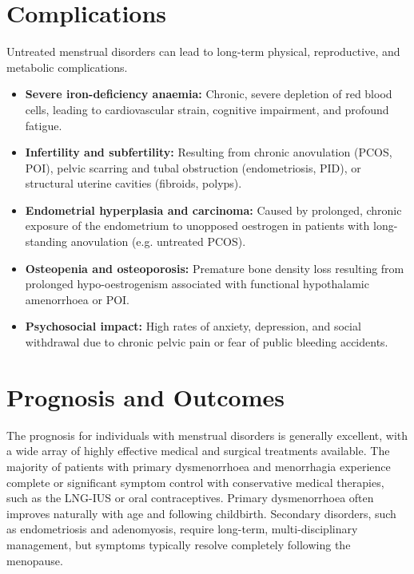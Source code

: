 \section*{Complications}
Untreated menstrual disorders can lead to long-term physical, reproductive, and metabolic complications.
\begin{itemize}
    \item \textbf{Severe iron-deficiency anaemia:} Chronic, severe depletion of red blood cells, leading to cardiovascular strain, cognitive impairment, and profound fatigue.
    \item \textbf{Infertility and subfertility:} Resulting from chronic anovulation (PCOS, POI), pelvic scarring and tubal obstruction (endometriosis, PID), or structural uterine cavities (fibroids, polyps).
    \item \textbf{Endometrial hyperplasia and carcinoma:} Caused by prolonged, chronic exposure of the endometrium to unopposed oestrogen in patients with long-standing anovulation (e.g. untreated PCOS).
    \item \textbf{Osteopenia and osteoporosis:} Premature bone density loss resulting from prolonged hypo-oestrogenism associated with functional hypothalamic amenorrhoea or POI.
    \item \textbf{Psychosocial impact:} High rates of anxiety, depression, and social withdrawal due to chronic pelvic pain or fear of public bleeding accidents.
\end{itemize}

\section*{Prognosis and Outcomes}
The prognosis for individuals with menstrual disorders is generally excellent, with a wide array of highly effective medical and surgical treatments available. The majority of patients with primary dysmenorrhoea and menorrhagia experience complete or significant symptom control with conservative medical therapies, such as the LNG-IUS or oral contraceptives. Primary dysmenorrhoea often improves naturally with age and following childbirth. Secondary disorders, such as endometriosis and adenomyosis, require long-term, multi-disciplinary management, but symptoms typically resolve completely following the menopause.

